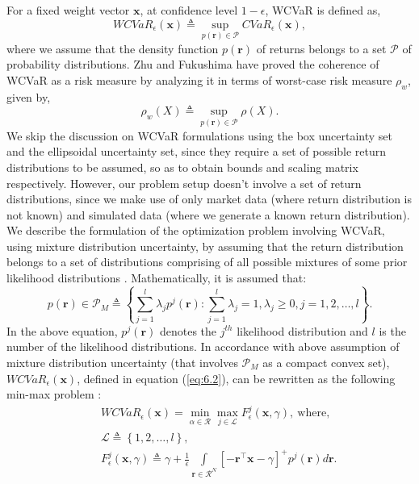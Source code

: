 \documentclass[12pt]{article}
\numberwithin{equation}{section}
\begin{document}
For a fixed weight vector $\mathbf{x}$, at confidence level $1-\epsilon$, WCVaR is defined as,
\begin{equation}
WCVaR_{\epsilon}(\mathbf{x}) \triangleq \sup_{p(\mathbf{r}) \in \mathcal{P}}CVaR_{\epsilon}(\mathbf{x}),
\label{eq:6.2}
\end{equation}
where we assume that the density function $p(\mathbf{r})$ of returns belongs to a set $\mathcal{P}$ of probability distributions. Zhu and Fukushima \cite{Zhu} have proved the coherence of WCVaR as a risk measure by analyzing it in terms of worst-case risk measure $\rho_{w}$, given by,
\begin{equation}
\rho_{w}(X) \triangleq \sup_{p(\mathbf{r}) \in \mathcal{P}} \rho (X).
\label{eq:6.3}
\end{equation}
We skip the discussion on WCVaR formulations using the box uncertainty set and the ellipsoidal uncertainty set, since they require a set of possible return distributions to be assumed, so as to obtain bounds and scaling matrix respectively. However, our problem setup doesn't involve a set of return distributions, since we make use of only market data (where return distribution is not known) and simulated data (where we generate a known return distribution).
We describe the formulation of the optimization problem involving WCVaR, using mixture distribution uncertainty, by assuming that the return distribution belongs to a set of distributions
comprising of all possible mixtures of some prior likelihood distributions \cite{Zhu}. Mathematically, it is assumed that:
\begin{equation}
p(\mathbf{r}) \in \mathcal{P}_{M} \triangleq \left\{\sum\limits_{j=1}^{l} \lambda_{j}p^{j}(\mathbf{r}):\sum\limits_{j=1}^{l}\lambda_{j}=1,
\lambda_{j} \geq 0,j=1,2,\dots,l \right\}.
\label{eq:6.8}
\end{equation}
In the above equation, $p^{j}(\mathbf{r})$ denotes the $j^{th}$ likelihood distribution and $l$ is the number of the likelihood distributions.
In accordance with above assumption of mixture distribution uncertainty (that involves $\mathcal{P}_{M}$ as a compact convex set),
$WCVaR_{\epsilon}(\mathbf{x})$, defined in equation (\ref{eq:6.2}), can be rewritten as the following min-max problem \cite{Zhu}:
\begin{eqnarray}
&& WCVaR_{\epsilon}(\mathbf{x})=\min_{\alpha \in \mathcal{R}} \max_{j \in \mathcal{L}} F_{\epsilon}^{j}(\mathbf{x},\gamma),~\text{where}, \nonumber \\
&& \mathcal{L} \triangleq \left\{1,2,\dots,l\right\}, \nonumber \\
&& F_{\epsilon}^{j}(\mathbf{x},\gamma) \triangleq \gamma+\frac{1}{\epsilon}\int \limits_{\mathbf{r} \in \mathcal{R}^{N}}
\left[-\mathbf{r}^{\top}\mathbf{x}-\gamma\right]^{+} p^{j}(\mathbf{r}) d\mathbf{r}.
\label{eq:6.9}
\end{eqnarray}
\end{document}
